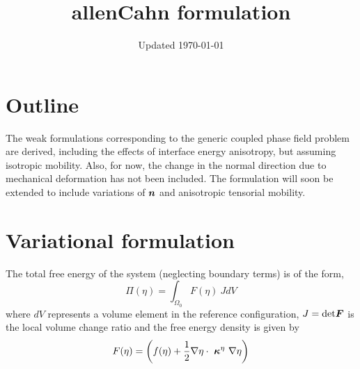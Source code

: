 


\makenomenclature 
\makeindex 

\title{allenCahn formulation}
\date{Updated \today} 

\maketitle
{}
\printnomenclature[1cm]
\vspace{.5in}

\section{Outline}
The weak formulations corresponding to the generic coupled phase field problem are derived, including the effects of interface energy anisotropy, but assuming isotropic mobility. Also, for now, the change in the normal direction due to mechanical deformation has not been included. The formulation will soon be extended to include variations of $\mbox{\boldmath$ n$}$ and anisotropic tensorial mobility.   
 
\section{Variational formulation}
The total free energy of the system (neglecting boundary terms) is of the form,
\begin{equation}
\Pi(\eta) = \int_{\Omega_0} F(\eta) ~J dV 
\end{equation}
where $dV$ represents a volume element in the reference configuration, $J= \text{det} \mbox{\boldmath$ F$}$ is the local volume change ratio and the free energy density is given by
\begin{equation}
 F(\eta) = \left(  f(\eta) + \frac{1}{2} \nabla  \eta  \cdot ~\mbox{\boldmath$\kappa$}^{\eta} ~\nabla  \eta\right)
\end{equation}

